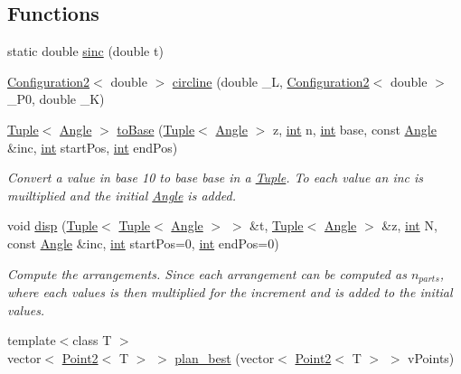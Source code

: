 \subsection*{Functions}
\begin{DoxyCompactItemize}
\item 
static double \mbox{\hyperlink{dubins_8hh_a5c88710b236a514392351a4d13d2e767}{sinc}} (double t)
\item 
\mbox{\hyperlink{class_configuration2}{Configuration2}}$<$ double $>$ \mbox{\hyperlink{dubins_8hh_adef8b363044d7fed558e5b47d8d6a3a0}{circline}} (double \+\_\+L, \mbox{\hyperlink{class_configuration2}{Configuration2}}$<$ double $>$ \+\_\+\+P0, double \+\_\+K)
\item 
\mbox{\hyperlink{class_tuple}{Tuple}}$<$ \mbox{\hyperlink{class_angle}{Angle}} $>$ \mbox{\hyperlink{dubins_8hh_a24a357b93081a0180dfec16136bc8ff7}{to\+Base}} (\mbox{\hyperlink{class_tuple}{Tuple}}$<$ \mbox{\hyperlink{class_angle}{Angle}} $>$ z, \mbox{\hyperlink{draw_8hh_aa620a13339ac3a1177c86edc549fda9b}{int}} n, \mbox{\hyperlink{draw_8hh_aa620a13339ac3a1177c86edc549fda9b}{int}} base, const \mbox{\hyperlink{class_angle}{Angle}} \&inc, \mbox{\hyperlink{draw_8hh_aa620a13339ac3a1177c86edc549fda9b}{int}} start\+Pos, \mbox{\hyperlink{draw_8hh_aa620a13339ac3a1177c86edc549fda9b}{int}} end\+Pos)
\begin{DoxyCompactList}\small\item\em Convert a value in base 10 to base {\ttfamily base} in a {\ttfamily \mbox{\hyperlink{class_tuple}{Tuple}}}. To each value an inc is muiltiplied and the initial {\ttfamily \mbox{\hyperlink{class_angle}{Angle}}} is added. \end{DoxyCompactList}\item 
void \mbox{\hyperlink{dubins_8hh_a16cf89e561eae9ea10a39e40432af238}{disp}} (\mbox{\hyperlink{class_tuple}{Tuple}}$<$ \mbox{\hyperlink{class_tuple}{Tuple}}$<$ \mbox{\hyperlink{class_angle}{Angle}} $>$ $>$ \&t, \mbox{\hyperlink{class_tuple}{Tuple}}$<$ \mbox{\hyperlink{class_angle}{Angle}} $>$ \&z, \mbox{\hyperlink{draw_8hh_aa620a13339ac3a1177c86edc549fda9b}{int}} N, const \mbox{\hyperlink{class_angle}{Angle}} \&inc, \mbox{\hyperlink{draw_8hh_aa620a13339ac3a1177c86edc549fda9b}{int}} start\+Pos=0, \mbox{\hyperlink{draw_8hh_aa620a13339ac3a1177c86edc549fda9b}{int}} end\+Pos=0)
\begin{DoxyCompactList}\small\item\em Compute the arrangements. Since each arrangement can be computed as $n_{parts}$, where each values is then multiplied for the increment and is added to the initial values. \end{DoxyCompactList}\item 
{\footnotesize template$<$class T $>$ }\\vector$<$ \mbox{\hyperlink{class_point2}{Point2}}$<$ T $>$ $>$ \mbox{\hyperlink{dubins_8hh_ae0b0aa229802950d33214a8a9e63ce5e}{plan\+\_\+best}} (vector$<$ \mbox{\hyperlink{class_point2}{Point2}}$<$ T $>$ $>$ v\+Points)
\end{DoxyCompactItemize}
